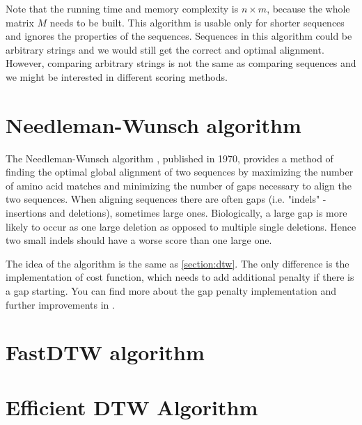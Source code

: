 Note that the running time and memory complexity is $n \times m$, because the whole matrix $M$ needs
to be built. This algorithm is usable only for shorter sequences and ignores the properties of the
sequences. Sequences in this algorithm could be arbitrary strings and we would still get the correct
and optimal alignment. However, comparing arbitrary strings is not the same as comparing sequences
and we might be interested in different scoring methods.

\section{Needleman-Wunsch algorithm}

The Needleman-Wunsch algorithm \cite{NEEDLEMAN1970443}, published in 1970, provides a method of
finding the optimal global alignment of two sequences by maximizing the number of amino acid matches
and minimizing the number of gaps necessary to align the two sequences. When aligning sequences
there are often gaps (i.e. "indels" - insertions and deletions), sometimes large ones. Biologically, a
large gap is more likely to occur as one large deletion as opposed to multiple single deletions.
Hence two small indels should have a worse score than one large one.

The idea of the algorithm is the same as \ref{section:dtw}. The only difference is the
implementation of cost function, which needs to add additional penalty if there is a gap starting.
You can find more about the gap penalty implementation and further improvements in
\cite{Boes2014ImprovingTN}.

\section{FastDTW algorithm}

\section{Efficient DTW Algorithm}
